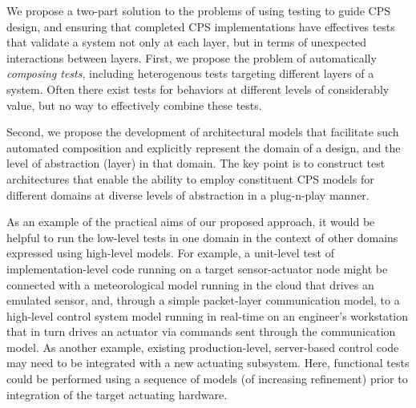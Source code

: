 We propose a two-part solution to the problems of using testing to guide CPS design, and ensuring that completed CPS implementations have effectives tests that validate a system not only at each layer, but in terms of unexpected interactions between layers.  First, we propose the problem of automatically \emph{composing tests}, including heterogenous tests targeting different layers of a system.  Often there exist tests for behaviors at different levels of considerably value, but no way to effectively combine these tests.

Second, we propose the development of architectural models that facilitate such automated composition and explicitly represent the domain of a design, and the level of abstraction (layer) in that domain.  The key point is to construct test architectures  that enable the ability to employ constituent CPS models for different domains at diverse levels of abstraction in a plug-n-play manner.

As an example of the practical aims of our proposed approach, it would be helpful to run the low-level tests in one domain in the context of other domains expressed using high-level models. For example, a unit-level test of implementation-level code running on a target sensor-actuator node might be connected with a meteorological model running in the cloud that drives an emulated sensor, and, through a simple packet-layer communication model, to a high-level control system model running in real-time on an engineer's workstation that in turn drives an actuator via commands sent through the communication model. As another example, existing production-level, server-based control code may need to be integrated with a new actuating subsystem. Here, functional tests could be performed using a sequence of models (of increasing refinement) prior to integration of the target actuating hardware.
